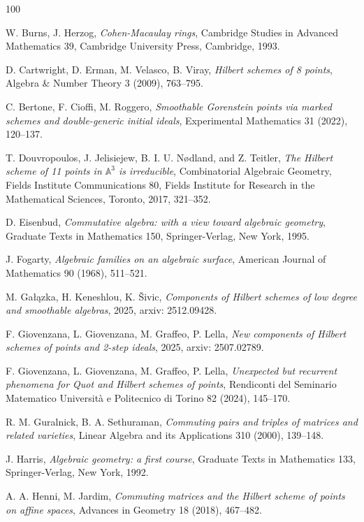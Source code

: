 \documentclass[11pt]{amsart}
\theoremstyle{definition}
\newcommand{\A}{\mathbb{A}}
\begin{document}
\begin{thebibliography}{100}

W. Burns, J. Herzog, {\em Cohen-Macaulay rings}, Cambridge Studies in Advanced Mathematics 39, Cambridge University Press, Cambridge, 1993.

D. Cartwright, D. Erman, M. Velasco, B. Viray, {\em Hilbert schemes of 8 points}, Algebra \& Number Theory 3 (2009), 763--795.

C. Bertone, F. Cioffi, M. Roggero, {\em Smoothable Gorenstein points via marked schemes and double-generic initial ideals}, Experimental Mathematics 31 (2022), 120--137.

T. Douvropoulos, J. Jelisiejew, B. I. U. Nødland, and Z. Teitler, {\em The Hilbert scheme of 11 points in $\A^3$ is irreducible}, Combinatorial Algebraic Geometry, Fields Institute Communications 80, Fields Institute for Research in the Mathematical Sciences, Toronto, 2017, 321--352.

D. Eisenbud, {\em Commutative algebra: with a view toward algebraic geometry}, Graduate Texts in Mathematics 150, Springer-Verlag, New York, 1995.

J. Fogarty, {\em Algebraic families on an algebraic surface}, American Journal of Mathematics 90 (1968), 511--521.

M. Ga{\l}\k{a}zka, H. Keneshlou, K. Šivic, {\em Components of Hilbert schemes of low degree and smoothable algebras}, 2025, arxiv: 2512.09428.

F. Giovenzana, L. Giovenzana, M. Graffeo, P. Lella, {\em New components of Hilbert schemes of points and 2-step ideals}, 2025, arxiv: 2507.02789.

F. Giovenzana, L. Giovenzana, M. Graffeo, P. Lella, {\em Unexpected but recurrent phenomena for Quot and Hilbert schemes of points}, Rendiconti del Seminario Matematico Università e Politecnico di Torino 82 (2024), 145--170.

R. M. Guralnick, B. A. Sethuraman, {\em Commuting pairs and triples of matrices and related varieties}, Linear Algebra and its Applications 310 (2000), 139--148.

J. Harris, {\em Algebraic geometry: a first course}, Graduate Texts in Mathematics 133, Springer-Verlag, New York, 1992.

A. A. Henni, M. Jardim, {\em Commuting matrices and the Hilbert scheme of points on affine spaces}, Advances in Geometry 18 (2018), 467--482.


\end{thebibliography}
\end{document}

